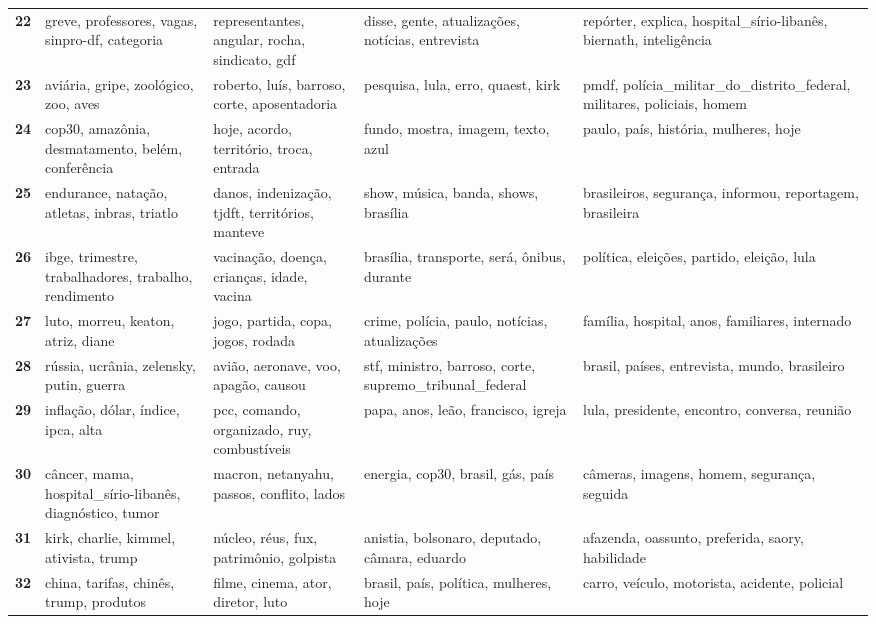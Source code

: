 \begin{xltabular}{\textwidth}{@{}l >{\RaggedRight\arraybackslash}X >{\RaggedRight\arraybackslash}X >{\RaggedRight\arraybackslash}X >{\RaggedRight\arraybackslash}X@{}}
    \textbf{22} & greve, professores, vagas, sinpro-df, categoria & representantes, angular, rocha, sindicato, gdf & disse, gente, atualizações, notícias, entrevista & repórter, explica, hospital\_sírio-libanês, biernath, inteligência \\
    \textbf{23} & aviária, gripe, zoológico, zoo, aves & roberto, luís, barroso, corte, aposentadoria & pesquisa, lula, erro, quaest, kirk & pmdf, polícia\_militar\_do\_distrito\_federal, militares, policiais, homem \\
    \textbf{24} & cop30, amazônia, desmatamento, belém, conferência & hoje, acordo, território, troca, entrada & fundo, mostra, imagem, texto, azul & paulo, país, história, mulheres, hoje \\
    \textbf{25} & endurance, natação, atletas, inbras, triatlo & danos, indenização, tjdft, territórios, manteve & show, música, banda, shows, brasília & brasileiros, segurança, informou, reportagem, brasileira \\
    \textbf{26} & ibge, trimestre, trabalhadores, trabalho, rendimento & vacinação, doença, crianças, idade, vacina & brasília, transporte, será, ônibus, durante & política, eleições, partido, eleição, lula \\
    \textbf{27} & luto, morreu, keaton, atriz, diane & jogo, partida, copa, jogos, rodada & crime, polícia, paulo, notícias, atualizações & família, hospital, anos, familiares, internado \\
    \textbf{28} & rússia, ucrânia, zelensky, putin, guerra & avião, aeronave, voo, apagão, causou & stf, ministro, barroso, corte, supremo\_tribunal\_federal & brasil, países, entrevista, mundo, brasileiro \\
    \textbf{29} & inflação, dólar, índice, ipca, alta & pcc, comando, organizado, ruy, combustíveis & papa, anos, leão, francisco, igreja & lula, presidente, encontro, conversa, reunião \\
    \textbf{30} & câncer, mama, hospital\_sírio-libanês, diagnóstico, tumor & macron, netanyahu, passos, conflito, lados & energia, cop30, brasil, gás, país & câmeras, imagens, homem, segurança, seguida \\
    \textbf{31} & kirk, charlie, kimmel, ativista, trump & núcleo, réus, fux, patrimônio, golpista & anistia, bolsonaro, deputado, câmara, eduardo & afazenda, oassunto, preferida, saory, habilidade \\
    \textbf{32} & china, tarifas, chinês, trump, produtos & filme, cinema, ator, diretor, luto & brasil, país, política, mulheres, hoje & carro, veículo, motorista, acidente, policial \\

\end{xltabular}
